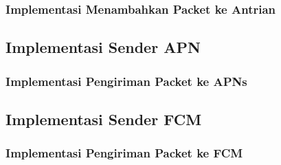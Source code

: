 \subsubsection{Implementasi Menambahkan Packet ke Antrian}

\subsection{Implementasi Sender APN}

\subsubsection{Implementasi Pengiriman Packet ke APNs}

\subsection{Implementasi Sender FCM}

\subsubsection{Implementasi Pengiriman Packet ke FCM}
